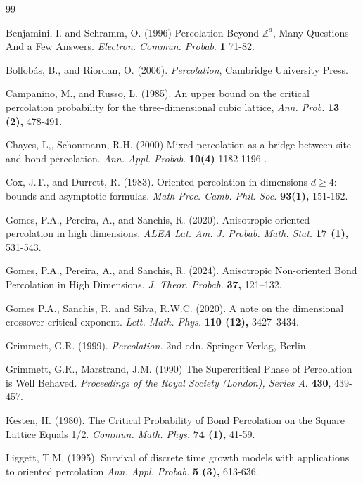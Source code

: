 \documentclass{aptpub}
\newcommand{\Z}{\mathbb{Z}}
\begin{document}
\begin{thebibliography}{99}

\footnotesize


 {\sc Benjamini, I. and  Schramm, O.} (1996) Percolation Beyond 
$\Z^d$, Many Questions And a Few Answers. {\em 
Electron. Commun. Probab}. {\bf 1} 71-82.


 {\sc Bollob\'as, B., and Riordan, O.} (2006). {\em Percolation}, Cambridge University Press.

 {\sc Campanino, M., and Russo, L.} (1985).  An upper bound on the critical percolation probability for the three-dimensional cubic lattice, {\em Ann. Prob.} {\bf 13 (2),} 478-491.


 {\sc  Chayes, L,, Schonmann, R.H.} (2000) Mixed percolation as a bridge between site and bond percolation. {\em Ann. Appl. Probab}. {\bf 10(4)} 1182-1196 .


 {\sc Cox, J.T., and  Durrett, R.} (1983).  Oriented percolation in dimensions $d \geq 4$: bounds and asymptotic formulas. {\em Math Proc. Camb. Phil. Soc.} {\bf 93(1),} 151-162.

 {\sc Gomes, P.A., Pereira, A., and Sanchis, R.} (2020).  Anisotropic oriented percolation in high dimensions. { \em ALEA Lat. Am. J. Probab. Math. Stat.} {\bf 17 (1),} 531-543.

 {\sc Gomes, P.A., Pereira, A., and Sanchis, R.} (2024). Anisotropic Non-oriented Bond Percolation in High
Dimensions.  { \em J. Theor. Probab.} {\bf 37,} 121–132.

 {\sc Gomes P.A., Sanchis, R. and Silva, R.W.C.} (2020). A note on the dimensional crossover critical exponent. {\em Lett. Math. Phys.} {\bf 110 (12),} 3427–3434.

 {\sc Grimmett, G.R.} (1999). {\em Percolation.} 2nd edn. Springer-Verlag, Berlin. 

 {\sc  Grimmett, G.R.,  Marstrand, J.M.} (1990) The Supercritical Phase of Percolation is Well Behaved. {\em Proceedings of the Royal Society (London), Series A}. {\bf 430}, 439-457.


 {\sc Kesten, H.} (1980).  The Critical Probability of Bond Percolation on the Square Lattice Equals 1/2. {\em Commun. Math. Phys.} {\bf 74 (1),} 41-59. 

 {\sc Liggett, T.M.}  (1995). Survival of discrete time growth models with applications to oriented percolation {\em Ann. Appl. Probab.} {\bf 5 (3),} 613-636.


\end{thebibliography}
\end{document}
